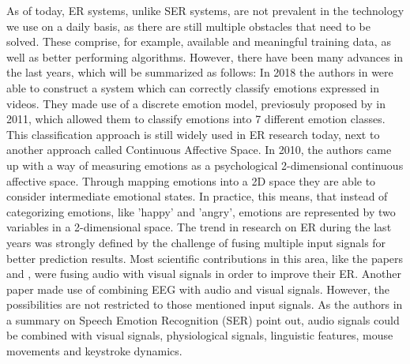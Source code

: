 \documentclass[11pt,a4paper]{scrbook}
\begin{document}
As of today, \gls{ER} systems, unlike \gls{SER} systems\cite{Akcay:2020:SpeechEmotionRecognition(SER)}, are not prevalent in the technology we use on a daily basis, as there are still multiple obstacles that need to be solved. These comprise, for example, available and meaningful training data, as well as better performing algorithms. However, there have been many advances in the last years, which will be summarized as follows: 
\newline\newline
In 2018 the authors in \cite{Salah:2018:Video-BasedEmotionRec}\cite{Sharma:2018:RealTimeFacial} were able to construct a system which can correctly classify emotions expressed in videos. They made use of a discrete emotion model, previosuly proposed by \citeauthor{Briesemeister:2011:DiscreteEmotion} in 2011\cite{Briesemeister:2011:DiscreteEmotion}, which allowed them to classify emotions into 7 different emotion classes. 
\newline\newline
This classification approach is still widely used in \gls{ER} research today, next to another approach called Continuous Affective Space. In 2010, the authors \citeauthor{Hupont:2010:FacialEmotionsIn2DAffectiveSpace} \cite{Hupont:2010:FacialEmotionsIn2DAffectiveSpace} came up with a way of measuring emotions as a psychological 2-dimensional continuous affective space. Through mapping emotions into a 2D space they are able to consider intermediate emotional states. In practice, this means, that instead of categorizing emotions, like 'happy' and 'angry', emotions are represented by two variables in a 2-dimensional space.
\newline\newline
The trend in research on \gls{ER} during the last years was strongly defined by the challenge of fusing multiple input signals for better prediction results. Most scientific contributions in this area, like the papers \cite{Yan:2016:MultiClueFusion} and \cite{Hossain:2019:AudioVisualER}, were fusing audio with visual signals in order to improve their \gls{ER}. Another paper \cite{Xing:2019:EEGAudioVisual} made use of combining EEG with audio and visual signals. However, the possibilities are not restricted to those mentioned input signals. As the authors in a summary on Speech Emotion Recognition (SER) \cite{Akcay:2020:SpeechEmotionRecognition(SER)} point out, audio signals could be combined with visual signals, physiological signals, linguistic features, mouse movements and keystroke dynamics.
\newline\newline
\end{document}

